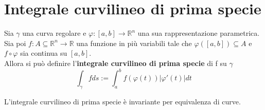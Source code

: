 \section{Integrale curvilineo di prima specie}
\begin{definition}
    Sia $\gamma$ una curva regolare e $\varphi:[a,b]\to \mathbb{R}^n$ una sua rappresentazione parametrica. Sia poi $f:A\subseteq \mathbb{R}^n \to \mathbb{R}$ una funzione in più variabili tale che $\varphi([a,b])\subseteq A$ e $f \circ\varphi$ sia continua su $[a,b]$.\\
    Allora si può definire l'\textbf{integrale curvilineo di prima specie} di f su $\gamma$
    \begin{equation*}
        \int_\gamma{fds} := \int_{a}^{b}{f(\varphi(t))|\varphi'(t)|dt}
    \end{equation*}
\end{definition}
\begin{theorem}
    L'integrale curvilineo di prima specie è invariante per equivalenza di curve.
\end{theorem}
